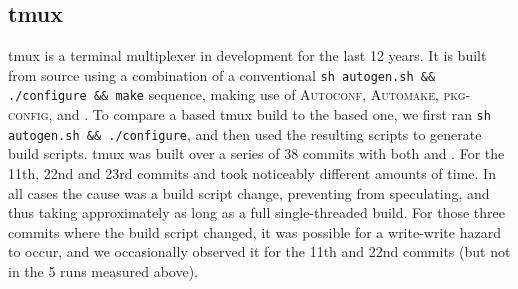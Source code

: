 
\subsection{tmux}
\label{sec:eval:tmux}



tmux is a terminal multiplexer in development for the last 12 years.  It is built from source using a combination of a conventional \verb|sh autogen.sh && ./configure && make| sequence, making use of \textsc{Autoconf}, \textsc{Automake}, \textsc{pkg-config}, and \Make.
To compare a \Rattle based tmux build to the \Make based one, we first ran \texttt{sh autogen.sh \&\& ./configure}, and then used the resulting \Make scripts to generate \Rattle build scripts. tmux was built over a series of 38 commits with both \Make and \Rattle. For the 11th, 22nd and 23rd commits \Rattle and \Make took noticeably different amounts of time. In all cases the cause was a build script change, preventing \Rattle from speculating, and thus taking approximately as long as a full single-threaded build.  For those three commits where the build script changed, it was possible for a write-write hazard to occur, and we occasionally observed it for the 11th and 22nd commits (but not in the 5 runs measured above).

